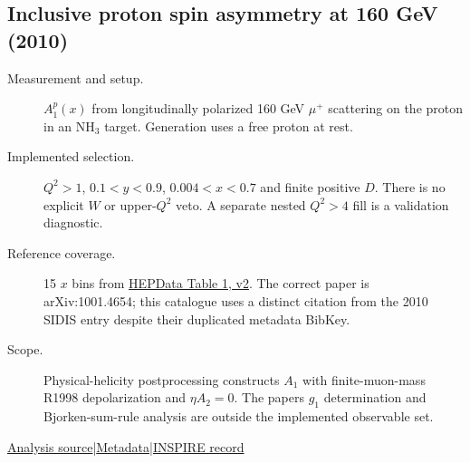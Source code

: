 \documentclass[11pt,a4paper]{article}
\newcommand{\id}[1]{{\small\texttt{\detokenize{#1}}}}
\begin{document}
\subsection{\texorpdfstring{Inclusive proton spin asymmetry at 160 GeV (2010)}{Inclusive proton spin asymmetry at 160 GeV (2010)}}
\id{COMPASS_2010_I843494}\quad\cite{r843494}
\begin{description}
\item[Measurement and setup.] $A_1^p(x)$ from longitudinally polarized 160 GeV $\mu^+$ scattering on the proton in an NH$_3$ target. Generation uses a free proton at rest.
\item[Implemented selection.] $Q^2>1$, $0.1<y<0.9$, $0.004<x<0.7$ and finite positive $D$. There is no explicit $W$ or upper-$Q^2$ veto. A separate nested $Q^2>4$ fill is a validation diagnostic.
\item[Reference coverage.] 15 $x$ bins from \href{https://doi.org/10.17182/hepdata.61588.v2/t1}{HEPData Table 1, v2}. The correct paper is arXiv:1001.4654; this catalogue uses a distinct citation from the 2010 SIDIS entry despite their duplicated metadata BibKey.
\item[Scope.] Physical-helicity postprocessing constructs $A_1$ with finite-muon-mass R1998 depolarization and $\eta A_2=0$. The paper\textquotesingle s $g_1$ determination and Bjorken-sum-rule analysis are outside the implemented observable set.
\end{description}
{\small\href{https://github.com/apapaefs/HerwigPolarizedPheno/blob/105045bd757aaa6b217e87811dc5f9a22a8d1cef/analyses/rivet/dis/COMPASS_2010_I843494.cc}{Analysis source}\quad|\quad\href{https://github.com/apapaefs/HerwigPolarizedPheno/blob/105045bd757aaa6b217e87811dc5f9a22a8d1cef/analyses/rivet/dis/COMPASS_2010_I843494.info}{Metadata}\quad|\quad\href{https://inspirehep.net/literature/843494}{INSPIRE record}}

\clearpage
{}
\end{document}
